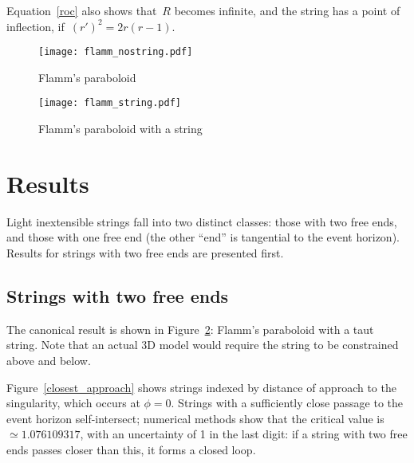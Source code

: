 \documentclass[prb,preprint]{revtex4-1}
\begin{document}
% 
% 
% 

Equation~\ref{roc} also shows that~$R$ becomes infinite, and the
string has a point of inflection,
if~$\left(r'\right)^2=2r\left(r-1\right)$.

\begin{figure}[h!]
\centering
\texttt{[image: flamm\_nostring.pdf]}
\caption{Flamm's paraboloid}
\label{flamm_nostring}
\end{figure}

\begin{figure}[h!]
\centering
\texttt{[image: flamm\_string.pdf]}
\caption{Flamm's paraboloid with a string}
\label{flamm_withstring}
\end{figure}

\section{Results}
Light inextensible strings fall into two distinct classes: those with
two free ends, and those with one free end (the other ``end'' is
tangential to the event horizon).  Results for strings with two free
ends are presented first.


\subsection{Strings with two free ends}

The canonical result is shown in Figure~\ref{flamm_withstring}:
Flamm's paraboloid with a taut string.  Note that an actual 3D model
would require the string to be constrained above and below.

Figure~\ref{closest_approach} shows strings indexed by distance of
approach to the singularity, which occurs at $\phi=0$.  Strings with a
sufficiently close passage to the event horizon self-intersect;
numerical methods show that the critical value is~$\simeq
1.076109317$, with an uncertainty of 1 in the last digit: if a string
with two free ends passes closer than this, it forms a closed loop.
\end{document}

